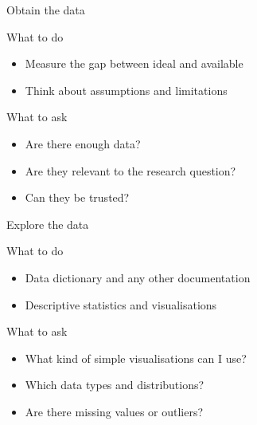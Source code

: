 \begin{frame}[t]{Obtain the data}
    \begin{block}{What to do}
        \begin{itemize}
            \item Measure the gap between ideal and available
            \item Think about assumptions and limitations
        \end{itemize}
    \end{block}
    \vfill
    \begin{block}{What to ask}
        \begin{itemize}
            \item Are there enough data?
            \item Are they relevant to the research question?
            \item Can they be trusted?
        \end{itemize}
    \end{block}
\end{frame}

\begin{frame}[t]{Explore the data}
    \begin{block}{What to do}
        \begin{itemize}
            \item Data dictionary and any other documentation
            \item Descriptive statistics and visualisations
        \end{itemize}
    \end{block}
    \vfill
    \begin{block}{What to ask}
        \begin{itemize}
            \item What kind of simple visualisations can I use?
            \item Which data types and distributions?
            \item Are there missing values or outliers?
        \end{itemize}
    \end{block}
\end{frame}

